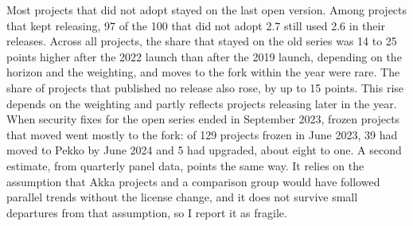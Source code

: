 \documentclass[11pt]{article}
\begin{document}
Most projects that did not adopt stayed on the last open version. Among projects that kept releasing, 97 of the 100 that did not adopt 2.7 still used 2.6 in their releases. Across all projects, the share that stayed on the old series was 14 to 25 points higher after the 2022 launch than after the 2019 launch, depending on the horizon and the weighting, and moves to the fork within the year were rare. The share of projects that published no release also rose, by up to 15 points. This rise depends on the weighting and partly reflects projects releasing later in the year. When security fixes for the open series ended in September 2023, frozen projects that moved went mostly to the fork: of 129 projects frozen in June 2023, 39 had moved to Pekko by June 2024 and 5 had upgraded, about eight to one. A second estimate, from quarterly panel data, points the same way. It relies on the assumption that Akka projects and a comparison group would have followed parallel trends without the license change, and it does not survive small departures from that assumption, so I report it as fragile.
\end{document}
